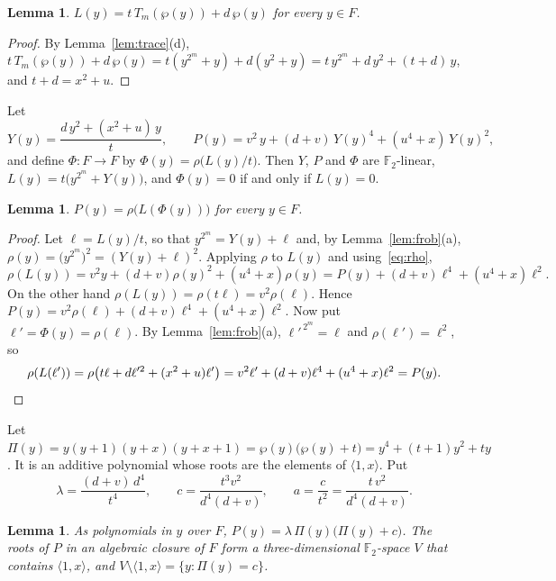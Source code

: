 \documentclass[11pt]{amsart}
\newtheorem{lemma}[theorem]{Lemma}
\theoremstyle{definition}
\theoremstyle{remark}
\numberwithin{equation}{section}
\newcommand{\F}{\mathbb{F}}
\begin{document}
\begin{lemma}\label{lem:Tm}
$L(y)=t\,T_m(\wp(y))+d\,\wp(y)$ for every $y\in F$.
\end{lemma}

\begin{proof}
By Lemma~\ref{lem:trace}(d), $t\,T_m(\wp(y))+d\,\wp(y)=t(y^{2^m}+y)+d(y^2+y)=t\,y^{2^m}+d\,y^2+(t+d)\,y$, and $t+d=x^2+u$.
\end{proof}

Let
\[
Y(y)=\frac{d\,y^2+(x^2+u)\,y}{t},\qquad P(y)=v^2\,y+(d+v)\,Y(y)^4+(u^4+x)\,Y(y)^2 ,
\]
and define $\Phi\colon F\to F$ by $\Phi(y)=\rho\bigl(L(y)/t\bigr)$. Then $Y$, $P$ and $\Phi$ are $\F_2$-linear, $L(y)=t\bigl(y^{2^m}+Y(y)\bigr)$, and $\Phi(y)=0$ if and only if $L(y)=0$.

\begin{lemma}\label{lem:key}
$P(y)=\rho\bigl(L(\Phi(y))\bigr)$ for every $y\in F$.
\end{lemma}

\begin{proof}
Let $\ell=L(y)/t$, so that $y^{2^m}=Y(y)+\ell$ and, by Lemma~\ref{lem:frob}(a), $\rho(y)=\bigl(y^{2^m}\bigr)^2=(Y(y)+\ell)^2$. Applying $\rho$ to $L(y)$ and using~\eqref{eq:rho},
\[
\rho(L(y))=v^2y+(d+v)\rho(y)^2+(u^4+x)\rho(y)=P(y)+(d+v)\ell^4+(u^4+x)\ell^2 .
\]
On the other hand $\rho(L(y))=\rho(t\ell)=v^2\rho(\ell)$. Hence $P(y)=v^2\rho(\ell)+(d+v)\ell^4+(u^4+x)\ell^2$. Now put $\ell'=\Phi(y)=\rho(\ell)$. By Lemma~\ref{lem:frob}(a), $\ell'^{\,2^m}=\ell$ and $\rho(\ell')=\ell^2$, so
\[
\rho(L(\ell'))=\rho\bigl(t\ell+d\ell'^2+(x^2+u)\ell'\bigr)=v^2\ell'+(d+v)\ell^4+(u^4+x)\ell^2=P(y). \qedhere
\]
\end{proof}

Let $\Pi(y)=y(y+1)(y+x)(y+x+1)=\wp(y)\bigl(\wp(y)+t\bigr)=y^4+(t+1)y^2+ty$. It is an additive polynomial whose roots are the elements of $\langle1,x\rangle$. Put
\[
\lambda=\frac{(d+v)\,d^4}{t^4},\qquad c=\frac{t^3v^2}{d^4(d+v)},\qquad a=\frac{c}{t^2}=\frac{t\,v^2}{d^4(d+v)} .
\]

\begin{lemma}\label{lem:factor}
As polynomials in $y$ over $F$, $P(y)=\lambda\,\Pi(y)\bigl(\Pi(y)+c\bigr)$. The roots of $P$ in an algebraic closure of $F$ form a three-dimensional $\F_2$-space $V$ that contains $\langle1,x\rangle$, and $V\setminus\langle1,x\rangle=\{y:\Pi(y)=c\}$.
\end{lemma}
\end{document}

